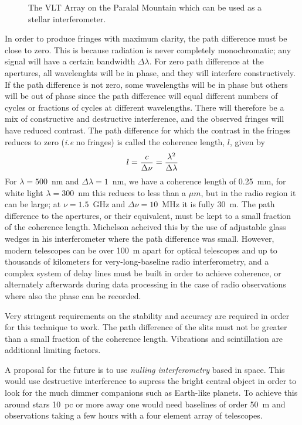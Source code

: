 \documentclass{article}
\begin{document}
\begin{figure}[h]
  \centering  {}
  \caption{The VLT Array on the Paralal Mountain which can be used as a stellar interferometer.}
  \label{fig:vlt-array}
\end{figure}

In order to produce fringes with maximum clarity, the path difference must be close to zero. This is because radiation is never completely monochromatic; any signal will have a certain bandwidth $\Delta\lambda$. For zero path difference at the apertures, all wavelenghts will be in phase, and they will interfere constructively. If the path difference is not zero, some wavelengths will be in phase but others will be out of phase since the path difference will equal different numbers of cycles or fractions of cycles at different wavelengths. There will therefore be a mix of constructive and destructive interference, and the observed fringes will have reduced contrast. The path difference for which the contrast in the fringes reduces to zero ({\it i.e} no fringes) is called the coherence length, $l$, given by
\[
l={c\over\Delta\nu}={\lambda^2\over\Delta\lambda}
\]
\noindent
For $\lambda=500$~nm and $\Delta\lambda=1$~nm, we have a coherence length of
0.25~mm, for white light $\lambda=300$~nm this reduces to less than a $\mu m$, but in the radio region it can be large; at $\nu=1.5$~GHz and $\Delta\nu=10$~MHz it is fully 30~m. The path difference to the apertures, or their equivalent, must be kept to a small fraction of the coherence length. Michelson acheived this by the use of adjustable glass wedges in his interferometer where the path difference was small. However, modern telescopes can be over 100~m apart for optical telescopes and up to thousands of kilometers for very-long-baseline radio interferometry, and a complex system of delay lines must be built in order to achieve coherence, or alternately afterwards during data processing in the case of radio observations where also the phase can be recorded.

Very stringent requirements on the stability and accuracy are required in order for this technique to work. The path difference of the slits must not be greater than a small fraction of the coherence length. %
Vibrations and scintillation are additional limiting factors.

A proposal for the future is to use {\it nulling interferometry} based in space. This would use destructive interference to supress the bright central object in order to look for the much dimmer companions such as Earth-like planets. To achieve this around stars 10~pc or more away one would need baselines of order 50~m and observations taking a few hours with a four element array of telescopes.
\end{document}
